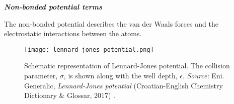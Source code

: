 \vspace{0.25cm}

\begin{center}
{\textbf{\textit{Non-bonded potential terms}}}
\end{center}
The non-bonded potential describes the van der Waals forces and the electrostatic interactions between the atoms. %

\begin{figure}[H]
\centering
\begin{minipage}[t]{0.68\textwidth}
	\centering
    \texttt{[image: lennard-jones\_potential.png]}
    
    \footnotesize{\caption{Schematic representation of Lennard-Jones potential. The collision parameter, $\sigma$, is shown along with the well depth, $\epsilon$.
    \textit{Source:} Eni. Generalic, \textit{Lennard-Jones potential} (Croatian-English Chemistry Dictionary \& Glossar, 2017) 
    \cite{ref:LJpot-graph}.}
    \label{fig:bounded_int}
    }
\end{minipage} 
\end{figure}

